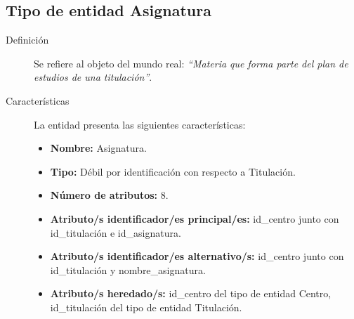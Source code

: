 \subsection{Tipo de entidad Asignatura}

   \begin{description}

   \item[Definición] Se refiere al objeto del mundo real: \emph{``Materia que
   forma parte del plan de estudios de una titulación''}.

   \item[Características] La entidad presenta las siguientes características:
      \begin{itemize}
         \item \textbf{Nombre:} Asignatura.
         \item \textbf{Tipo:} Débil por identificación con respecto a Titulación.
         \item \textbf{Número de atributos:} 8.
         \item \textbf{Atributo/s identificador/es principal/es:} id\_centro junto con \\id\_titulación e id\_asignatura.
         \item \textbf{Atributo/s identificador/es alternativo/s:} id\_centro junto con \\id\_titulación y nombre\_asignatura.
         \item \textbf{Atributo/s heredado/s:} id\_centro del tipo de entidad Centro, \\id\_titulación del tipo de entidad Titulación.
      \end{itemize}


\end{description}
